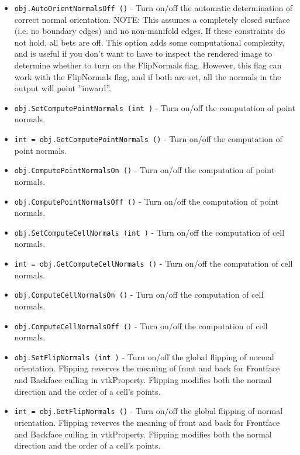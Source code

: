 \begin{itemize}
\item  \verb|obj.AutoOrientNormalsOff ()| -  Turn on/off the automatic determination of correct normal
 orientation. NOTE: This assumes a completely closed surface
 (i.e. no boundary edges) and no non-manifold edges. If these
 constraints do not hold, all bets are off. This option adds some
 computational complexity, and is useful if you don't want to have
 to inspect the rendered image to determine whether to turn on the 
 FlipNormals flag. However, this flag can work with the FlipNormals 
 flag, and if both are set, all the normals in the output will 
 point ''inward''.

\item  \verb|obj.SetComputePointNormals (int )| -  Turn on/off the computation of point normals.

\item  \verb|int = obj.GetComputePointNormals ()| -  Turn on/off the computation of point normals.

\item  \verb|obj.ComputePointNormalsOn ()| -  Turn on/off the computation of point normals.

\item  \verb|obj.ComputePointNormalsOff ()| -  Turn on/off the computation of point normals.

\item  \verb|obj.SetComputeCellNormals (int )| -  Turn on/off the computation of cell normals.

\item  \verb|int = obj.GetComputeCellNormals ()| -  Turn on/off the computation of cell normals.

\item  \verb|obj.ComputeCellNormalsOn ()| -  Turn on/off the computation of cell normals.

\item  \verb|obj.ComputeCellNormalsOff ()| -  Turn on/off the computation of cell normals.

\item  \verb|obj.SetFlipNormals (int )| -  Turn on/off the global flipping of normal orientation. Flipping
 reverves the meaning of front and back for Frontface and Backface
 culling in vtkProperty.  Flipping modifies both the normal
 direction and the order of a cell's points.

\item  \verb|int = obj.GetFlipNormals ()| -  Turn on/off the global flipping of normal orientation. Flipping
 reverves the meaning of front and back for Frontface and Backface
 culling in vtkProperty.  Flipping modifies both the normal
 direction and the order of a cell's points.


\end{itemize}
